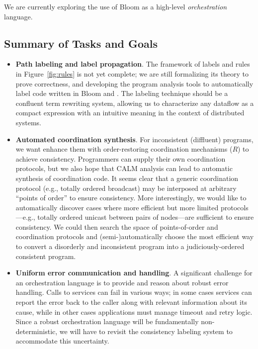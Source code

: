 We are currently exploring the use of Bloom as a high-level \emph{orchestration} language.  

\subsection{Summary of Tasks and Goals}
\begin{itemize}
\item \textbf{Path labeling and label propagation}.
The framework of labels and rules in Figure~\ref{fig:rules} is not yet complete; we are still formalizing its theory to prove correctness, and developing the program analysis tools to automatically label code written in Bloom and \blooml.  The labeling technique should be a confluent term rewriting system, allowing us to 
characterize any dataflow as a compact expression with an intuitive 
meaning in the context of distributed systems.

\item \textbf{Automated coordination synthesis}.
For inconsistent (diffluent) programs, we want enhance them with order-restoring coordination mechanisms ($R$) to achieve consistency.
Programmers can supply their own coordination protocols, but we also hope that CALM analysis can lead to automatic synthesis of coordination code. 
It seems clear that a generic coordination 
protocol (e.g., totally ordered broadcast) may be interposed at arbitrary 
``points of order''
to ensure consistency.  More interestingly, we would like to automatically
discover cases where more efficient but more limited protocols---e.g., totally ordered unicast between pairs of nodes---are sufficient to ensure consistency.  We could then search the space of points-of-order and coordination protocols and (semi-)automatically choose the most efficient way to convert a disorderly and inconsistent program into a judiciously-ordered consistent program.

\item \textbf{Uniform error communication and handling}.
A significant challenge for an orchestration language is to provide and reason about robust error handling.
Calls to services can fail in various ways; in some cases services can report the error
back to the caller along with relevant information about its cause, while in other cases
applications must manage timeout and retry logic.  Since a robust orchestration language will
be fundamentally non-deterministic, we will have to revisit the consistency labeling system to
accommodate this uncertainty.


\end{itemize}
